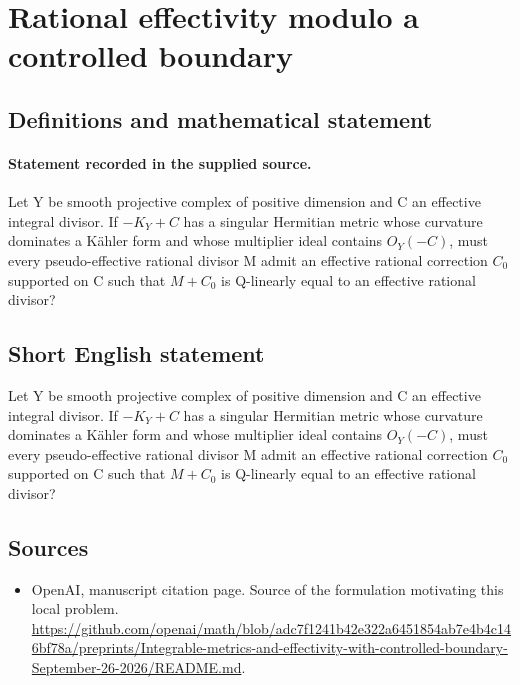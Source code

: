 \documentclass[11pt]{article}
\begin{document}
\section*{Rational effectivity modulo a controlled boundary}\label{statement}
\subsection{Definitions and mathematical statement}
\paragraph{Statement recorded in the supplied source.}
Let Y be smooth projective complex of positive dimension and C an effective integral divisor. If $-K_Y+C$ has a singular Hermitian metric whose curvature dominates a Kähler form and whose multiplier ideal contains $O_Y(-C)$, must every pseudo-effective rational divisor M admit an effective rational correction $C_{0}$ supported on C such that $M+C_{0}$ is Q-linearly equal to an effective rational divisor?
\subsection{Short English statement}
Let Y be smooth projective complex of positive dimension and C an effective integral divisor. If $-K_Y+C$ has a singular Hermitian metric whose curvature dominates a Kähler form and whose multiplier ideal contains $O_Y(-C)$, must every pseudo-effective rational divisor M admit an effective rational correction $C_{0}$ supported on C such that $M+C_{0}$ is Q-linearly equal to an effective rational divisor?
\subsection{Sources}
\begin{itemize}
\item[S1] OpenAI, manuscript citation page. Source of the formulation motivating this local problem.
\url{https://github.com/openai/math/blob/adc7f1241b42e322a6451854ab7e4b4c146bf78a/preprints/Integrable-metrics-and-effectivity-with-controlled-boundary-September-26-2026/README.md}.
\end{itemize}
\end{document}
